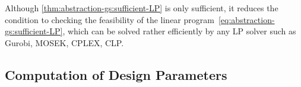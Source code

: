 Although \cref{thm:abstraction-gs:sufficient-LP} is only sufficient, it reduces the condition to checking the feasibility of the linear program~\eqref{eq:abstraction-gs:sufficient-LP}, which can be solved rather efficiently by any LP solver such as Gurobi, MOSEK, CPLEX, CLP.


\subsection{Computation of Design Parameters}
\label{sec:abstraction-gs:computation}







